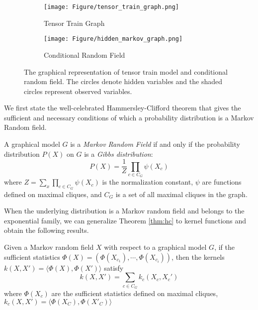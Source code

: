  \begin{figure}[htbp]
	\begin{center}
		\begin{subfigure}[b]{0.55\linewidth}		\texttt{[image: Figure/tensor\_train\_graph.png]}
			\caption{Tensor Train Graph}
			\label{fig:lorenz_data}
		\end{subfigure}
		\begin{subfigure}[b]{0.4\textwidth}		\texttt{[image: Figure/hidden\_markov\_graph.png]}
			\caption{Conditional Random Field}
			\label{fig:lorenz_20}
		\end{subfigure}
	\end{center}
\vskip -0.1in
\caption{The graphical representation of tensor train model and conditional random field. The circles denote hidden variables and the shaded circles represent observed variables.}
\label{fig:tt-crf}
\end{figure}


We first state the well-celebrated Hammersley-Clifford theorem that gives the sufficient and necessary conditions of which a probability distribution  is a Markov Random field.

\begin{theorem}
A  graphical model  $G$ is a \textit{Markov Random Field} if and only if
the probability distribution $P(X)$ on $G$ is a \textit{Gibbs distribution}:
\[P(X)= \frac{1}{Z} \prod_{c\in C_G}\psi(X_c) \]
where $Z=\sum_x  \prod_{c\in C_G}\psi(X_c)$ is the normalization constant, $\psi$ are functions defined on maximal cliques, and $C_G$ is a set of all maximal cliques in the graph.
\label{thm:hc}
\end{theorem}

When the underlying distribution is a Markov random  field and belongs to the exponential family, we can generalize Theorem \ref{thm:hc} to kernel functions and obtain the following results.
\begin{lemma} \cite{altun2012exponential}
Given a Markov random field $X$ with respect to a graphical model $G$, if  the sufficient statistics $\Phi(X) = (\Phi(X_{c_1}) , \cdots, \Phi(X_{c_i}) )$, then the kernels  $k(X, X')=\langle \Phi(X), \Phi(X')\rangle $ satisfy
\[k(X, X') = \sum_{c\in C_G}k_c(X_c, X_c')\]
where  $\Phi(X_c)$ are the sufficient statistics defined on maximal cliques, $k_c(X, X') = \langle \Phi(X_C), \Phi(X'_C) \rangle $
\label{thm:khc}
\end{lemma}




